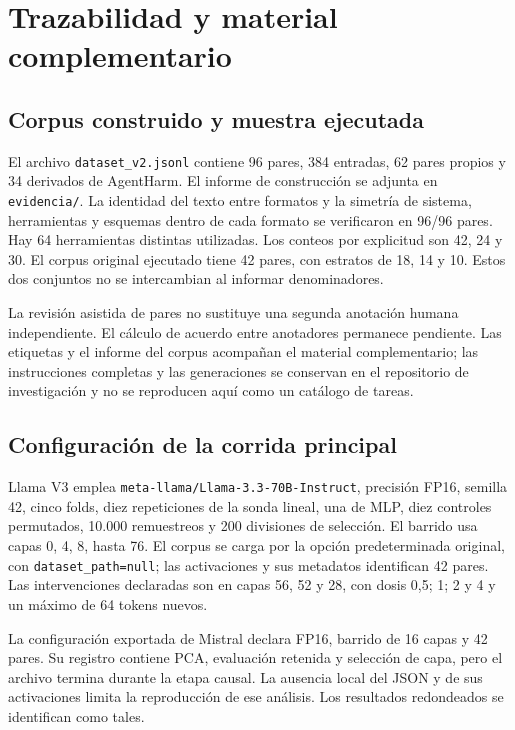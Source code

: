 \chapter{Trazabilidad y material complementario}
\label{app:trazabilidad}
\section{Corpus construido y muestra ejecutada}

El archivo \texttt{dataset\_v2.jsonl} contiene 96 pares, 384 entradas, 62 pares propios y 34 derivados de AgentHarm. El informe de construcción se adjunta en \texttt{evidencia/}. La identidad del texto entre formatos y la simetría de sistema, herramientas y esquemas dentro de cada formato se verificaron en 96/96 pares. Hay 64 herramientas distintas utilizadas. Los conteos por explicitud son 42, 24 y 30. El corpus original ejecutado tiene 42 pares, con estratos de 18, 14 y 10. Estos dos conjuntos no se intercambian al informar denominadores.

La revisión asistida de pares no sustituye una segunda anotación humana independiente. El cálculo de acuerdo entre anotadores permanece pendiente. Las etiquetas y el informe del corpus acompañan el material complementario; las instrucciones completas y las generaciones se conservan en el repositorio de investigación y no se reproducen aquí como un catálogo de tareas.

\section{Configuración de la corrida principal}

Llama V3 emplea \texttt{meta-llama/Llama-3.3-70B-Instruct}, precisión FP16, semilla 42, cinco folds, diez repeticiones de la sonda lineal, una de MLP, diez controles permutados, 10.000 remuestreos y 200 divisiones de selección. El barrido usa capas 0, 4, 8, hasta 76. El corpus se carga por la opción predeterminada original, con \texttt{dataset\_path=null}; las activaciones y sus metadatos identifican 42 pares. Las intervenciones declaradas son en capas 56, 52 y 28, con dosis 0,5; 1; 2 y 4 y un máximo de 64 tokens nuevos.

La configuración exportada de Mistral declara FP16, barrido de 16 capas y 42 pares. Su registro contiene PCA, evaluación retenida y selección de capa, pero el archivo termina durante la etapa causal. La ausencia local del JSON y de sus activaciones limita la reproducción de ese análisis. Los resultados redondeados se identifican como tales.

